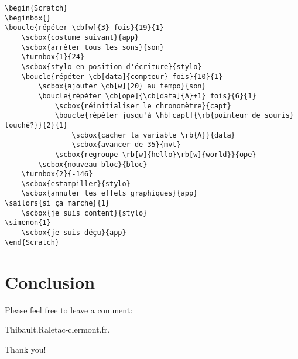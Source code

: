 \documentclass[a4paper,11pt]{article}
\begin{document}
\begin{center}
\begin{Scratch}[1]%
	\blank
{}
\end{Scratch}
\end{center}
\newpage
\begin{verbatim}
\begin{Scratch}
\beginbox{}
\boucle{répéter \cb[w]{3} fois}{19}{1}
	\scbox{costume suivant}{app}
	\scbox{arrêter tous les sons}{son}
	\turnbox{1}{24}
	\scbox{stylo en position d'écriture}{stylo}
	\boucle{répéter \cb[data]{compteur} fois}{10}{1}
		\scbox{ajouter \cb[w]{20} au tempo}{son}
		\boucle{répéter \cb[ope]{\cb[data]{A}+1} fois}{6}{1}
			\scbox{réinitialiser le chronomètre}{capt}
			\boucle{répéter jusqu'à \hb[capt]{\rb{pointeur de souris} touché?}}{2}{1}
				\scbox{cacher la variable \rb{A}}{data}
				\scbox{avancer de 35}{mvt}
			\scbox{regroupe \rb[w]{hello}\rb[w]{world}}{ope}
		\scbox{nouveau bloc}{bloc}
	\turnbox{2}{-146}
	\scbox{estampiller}{stylo}
	\scbox{annuler les effets graphiques}{app}
\sailors{si ça marche}{1}
	\scbox{je suis content}{stylo}
\simenon{1}
	\scbox{je suis déçu}{app}
\end{Scratch}
\end{verbatim}

\begin{center}
\begin{Scratch}[1]%
\beginbox{}
\end{Scratch}
\end{center}

\newpage
\section{Conclusion}

Please feel free to leave a comment:

Thibault.Ralet\at ac-clermont.fr.

Thank you!
\end{document}
